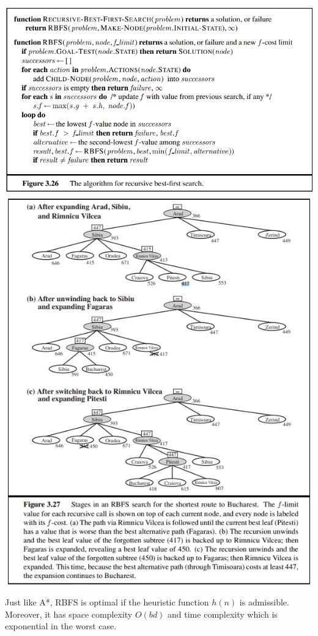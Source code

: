 \begin{center}
    \includegraphics[scale=0.8]{images/RBFS-algo.png}
    \includegraphics[]{images/RBFS.png}
\end{center}
Just like A*, RBFS is optimal if the heuristic function $h(n)$ is admissible. Moreover, it has space complexity $O(bd)$ and time complexity which is exponential in the worst case.\newline\newline

